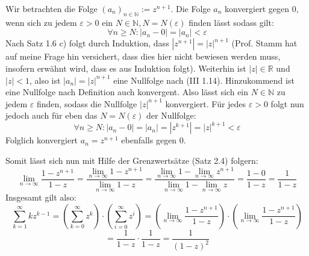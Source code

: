 \documentclass[a4paper,graphics,11pt]{article}
\begin{document}
Wir betrachten die Folge $(a_n)_{n\in \mathbb{N}} := z^{n+1}$.
Die Folge $a_n$ konvergiert gegen 0, wenn sich zu jedem $\varepsilon > 0$ ein 
$N \in \mathbb{N}, N = N(\varepsilon)$ finden lässt sodass gilt:
$$
    \forall n \geq N\colon |a_n - 0| = |a_n| < \varepsilon
$$
Nach Satz 1.6 c) folgt durch Induktion, dass $|z^{n+1}| = |z|^{n+1}$ (Prof. Stamm hat auf
meine Frage hin versichert, dass dies hier nicht bewiesen werden muss, insofern erwähnt wird, dass
es aus Induktion folgt). Weiterhin ist $|z| \in \mathbb{R}$
und $|z| < 1$, also ist $|a_n| = |z|^{n+1}$ eine Nullfolge nach (III 1.14). Hinzukommend
ist eine Nullfolge nach Definition auch konvergent. Also lässt sich ein $N\in \mathbb{N}$ 
zu jedem $\varepsilon$ finden, sodass die Nullfolge $|z|^{n+1}$ konvergiert.
Für jedes $\varepsilon > 0$ folgt nun jedoch auch für eben das $N = N(\varepsilon)$ der
Nullfolge:
$$
    \forall n \geq N \colon |a_n - 0| = |a_n| = |z^{k+1}| = |z|^{k+1} < \varepsilon
$$
Folglich konvergiert $a_n = z^{n+1}$ ebenfalls gegen 0.

Somit lässt sich nun mit Hilfe der Grenzwertsätze (Satz 2.4) folgern:
$$
    \lim_{n \to \infty} \frac{1-z^{n+1}}{1-z}
    = \frac{\lim_{n \to \infty}\limits 1-z^{n+1}}{\lim_{n \to \infty}\limits 1-z}
    = \frac{\lim_{n \to \infty}\limits 1-\lim_{n \to \infty}\limits z^{n+1}}
        {\lim_{n \to \infty}\limits1- \lim_{n \to \infty}\limits z}
    =\frac{1-0}{1-z} = \frac{1}{1-z}
$$
Insgesamt gilt also:
$$
    \sum_{k=1}^{\infty} kz^{k-1}
    =\left(\sum_{k=0}^{\infty} z^k\right)\cdot\left(\sum_{i=0}^{\infty}z^i\right)
    = \left(\lim_{n \to \infty} \frac{1-z^{n+1}}{1-z}\right)\cdot\left(\lim_{n \to \infty} \frac{1-z^{n+1}}{1-z}\right)
$$$$
    = \frac{1}{1-z} \cdot \frac{1}{1-z} = \frac{1}{(1-z)^2}
$$
\end{document}
